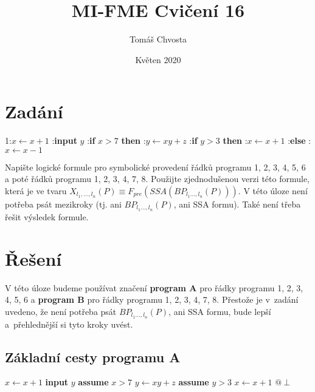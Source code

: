 \documentclass{article}
\title{MI-FME Cvičení 16}
\author{Tomáš Chvosta}
\date{Květen 2020}
\newcommand\tab[1][0.5cm]{\hspace*{#1}}
\begin{document}
\maketitle

\section{Zadání}

1:\tab $x \leftarrow x + 1$ :\tab \textbf{input} $y$ :\tab \textbf{if} $x > 7$ \textbf{then} :\tab\tab $y \leftarrow xy + z$ :\tab\tab \textbf{if} $y > 3$ \textbf{then} :\tab\tab\tab $x \leftarrow x + 1$ :\tab\tab \textbf{else} :\tab\tab\tab $x \leftarrow x - 1$ \newline

Napište logické formule pro symbolické provedení řádků programu 1, 2, 3, 4, 5, 6 a poté řádků programu 1, 2, 3, 4, 7, 8. Použijte zjednodušenou verzi této formule, která je ve tvaru $X_{l_1,\dots,l_n}(P) \equiv F_{pre}(SSA(BP_{l_1\dots,l_n}(P)))$. V této úloze není potřeba psát mezikroky (tj. ani $BP_{l_1\dots,l_n}(P)$, ani SSA formu). Také není třeba řešit výsledek formule. 

\section{Řešení}

V této úloze budeme používat značení \textbf{program A} pro řádky programu 1, 2, 3, 4, 5, 6 a \textbf{program B} pro řádky programu 1, 2, 3, 4, 7, 8. Přestože je v~zadání uvedeno, že není potřeba psát $BP_{l_1\dots,l_n}(P)$, ani SSA formu, bude lepší a~přehlednější si tyto kroky uvést. 

\subsection{Základní cesty programu A }
$x \leftarrow x + 1$ \newline
\textbf{input} $y$ \newline
\textbf{assume} $x > 7$ \newline
$y \leftarrow xy + z$ \newline
\textbf{assume} $y > 3$ \newline
$x \leftarrow x + 1$ \newline
$@\ \bot$
\end{document}

